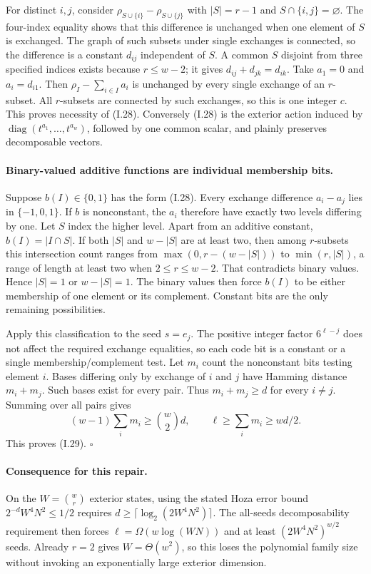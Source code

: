 \documentclass[11pt,a4paper]{article}
\theoremstyle{definition}\newtheorem{definition}{Definition}
\begin{document}
For distinct $i,j$, consider
$\rho_{S\cup\{i\}}-\rho_{S\cup\{j\}}$ with
$|S|=r-1$ and $S\cap\{i,j\}=\varnothing$.
The four-index equality shows that this difference is unchanged
when one element of $S$ is exchanged.  The graph of such subsets
under single exchanges is connected, so the difference is a
constant $d_{ij}$ independent of $S$.  A common $S$ disjoint
from three specified indices exists because $r\le w-2$;
it gives $d_{ij}+d_{jk}=d_{ik}$.  Take $a_1=0$ and
$a_i=d_{i1}$.  Then
$\rho_I-\sum_{i\in I}a_i$ is unchanged by every single exchange
of an $r$-subset.  All $r$-subsets are connected by such
exchanges, so this is one integer $c$.  This proves necessity
of (I.28).  Conversely (I.28) is the exterior action induced by
$\operatorname{diag}(t^{a_1},\ldots,t^{a_w})$, followed by
one common scalar, and plainly preserves decomposable vectors.

\paragraph{Binary-valued additive functions are individual membership bits.}
Suppose $b(I)\in\{0,1\}$ has the form (I.28).
Every exchange difference $a_i-a_j$ lies in $\{-1,0,1\}$.
If $b$ is nonconstant, the $a_i$ therefore have exactly two
levels differing by one.  Let $S$ index the higher level.
Apart from an additive constant, $b(I)=|I\cap S|$.
If both $|S|$ and $w-|S|$ are at least two, then among
$r$-subsets this intersection count ranges from
$\max(0,r-(w-|S|))$ to $\min(r,|S|)$, a range of length
at least two when $2\le r\le w-2$.  That contradicts binary
values.  Hence $|S|=1$ or $w-|S|=1$.
The binary values then force $b(I)$ to be either membership
of one element or its complement.  Constant bits are the only
remaining possibilities.

Apply this classification to the seed $s=e_j$.  The positive
integer factor $6^{\ell-j}$ does not affect the required
exchange equalities, so each code bit is a constant or a single
membership/complement test.  Let $m_i$ count the nonconstant
bits testing element $i$.  Bases differing only by exchange of
$i$ and $j$ have Hamming distance $m_i+m_j$.  Such bases exist
for every pair.  Thus $m_i+m_j\ge d$ for every $i\ne j$.
Summing over all pairs gives
\[
 (w-1)\sum_i m_i\ge\binom w2d,
 \qquad \ell\ge\sum_i m_i\ge wd/2.
\]
This proves (I.29). \hfill$\square$

\paragraph{Consequence for this repair.}
On the $W=\binom wr$ exterior states, using the stated Hoza
error bound $2^{-d}W^4N^2\le1/2$ requires
$d\ge\lceil\log_2(2W^4N^2)\rceil$.
The all-seeds decomposability requirement then forces
$\ell=\Omega(w\log(WN))$ and at least
$(2W^4N^2)^{w/2}$ seeds.  Already $r=2$ gives
$W=\Theta(w^2)$, so this loses the polynomial family size
without invoking an exponentially large exterior dimension.
\end{document}
